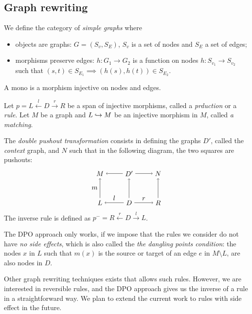 
\subsection{Graph rewriting}

\begin{definition}
  We define the category of \emph{simple graphs} where
  \begin{itemize}
  \item objects are graphs: $G = (S_v,S_E)$, $S_v$ is a set of nodes and $S_E$ a set of edges;
  \item morphisms preserve edges: $h:G_1\to G_2$ is a function on nodes $h:S_{v_1}\to S_{v_2}$ such that $(s,t)\in S_{E_1}\implies (h(s),h(t))\in S_{E_2}$.
  \end{itemize}
\end{definition}

A mono is a morphism injective on nodes and edges.

\begin{definition}
  Let $p = L\overset{l}{\leftarrow} D \overset{r}{\rightarrow} R$ be a span of injective morphisms, called a \emph{prduction} or a \emph{rule}. Let $M$ be a graph and $L\hookrightarrow M$ be an injective morphism in $M$, called \emph{a matching}.

  The \emph{double pushout transformation} consists in defining the graphs $D'$, called the \emph{context} graph, and $N$ such that in the following diagram, the two squares are pushouts:
  \[
  \begin{tikzpicture} %
    \node (l) at (-1.5,0) {\(L\)};
    \node (d) at (0,0) {\(D\)};
    \node (r) at (1.5,0) {\(R\)};
    \node (m) at (-1.5,1.5) {\(M\)};
    \node (d') at (0,1.5) {\(D'\)};
    \node (n) at (1.5,1.5) {\(N\)};
    \draw [->] (d) -- node [above,midway] {\(l\)} (l);
    \draw [->] (d) -- node [above,midway] {\(r\)} (r);
    \draw [->] (d') -- (m);
    \draw [->] (d') -- (n);
    \draw [->] (l) -- node [left,midway] {\(m\)}  (m);
    \draw [->] (d) -- (d');
    \draw [->] (r) -- (n);
  \end{tikzpicture}
  \]
  The inverse rule is defined as $p^{-} = R\overset{r}{\leftarrow} D \overset{l}{\rightarrow} L$.
\end{definition}

\begin{remark}
  The DPO approach only works, if we impose that the rules we consider do not have \emph{no side effects}, which is also called the \emph{the dangling points condition}: the nodes $x$ in $L$ such that $m(x)$ is the source or target of an edge $e$ in $M\setminus L$, are also nodes in $D$.

  Other graph rewriting techniques exists that allows such rules. However, we are interested in reversible rules, and the DPO approach gives us the inverse of a rule in a straightforward way. We plan to extend the current work to rules with side effect in the future.
\end{remark}

